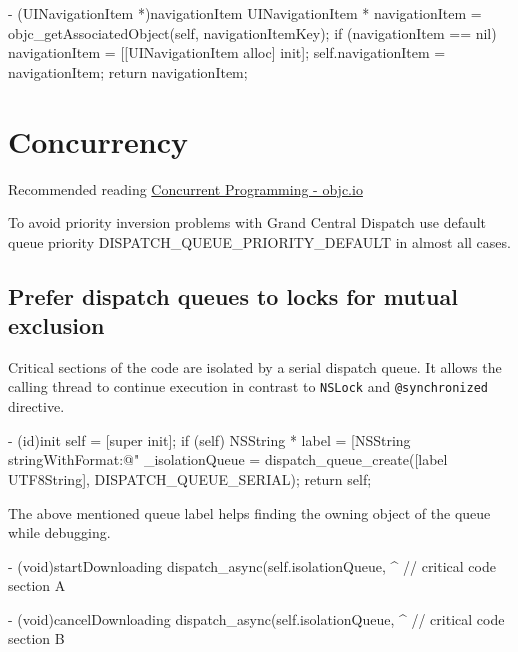 \documentclass[10pt]{extarticle}
\newenvironment{codelisting}
{\footnotesize\mdframed[middlelinewidth=0.5pt, middlelinecolor=BaliHaiColor, skipabove=15pt]\verbatim}
{\endverbatim\endmdframed\vspace{12pt}\normalsize}
\newenvironment{importantlisting}
{\mdframed[middlelinewidth=0.5pt, middlelinecolor=MatisseColor, skipabove=15pt]{\textbf{Important:}}}
{\endmdframed\vspace{12pt}}
\newcommand{\inlinecode}[1]{{\textcolor{TundoraColor}{\texttt{#1}}}}
\begin{document}
\begin{codelisting}
- (UINavigationItem *)navigationItem
{
    UINavigationItem * navigationItem = objc_getAssociatedObject(self, navigationItemKey);
    if (navigationItem == nil) {
        navigationItem = [[UINavigationItem alloc] init];
        self.navigationItem = navigationItem;
    }
    return navigationItem;
}
\end{codelisting}


\section{Concurrency}

Recommended reading  \href{http://www.objc.io/issue-2/}{Concurrent Programming - objc.io}

\begin{importantlisting}
To avoid priority inversion problems with Grand Central Dispatch use default queue priority DISPATCH\_QUEUE\_PRIORITY\_DEFAULT in almost all cases.
\end{importantlisting}


\subsection{Prefer dispatch queues to locks for mutual exclusion}

Critical sections of the code are isolated by a serial dispatch queue. It allows the calling thread to continue execution in contrast to \inlinecode{NSLock} and \inlinecode{@synchronized} directive.

\begin{codelisting}
- (id)init
{
    self = [super init];
    if (self) {
        NSString * label = [NSString stringWithFormat:@"%
        _isolationQueue = dispatch_queue_create([label UTF8String], DISPATCH_QUEUE_SERIAL);
    }
    return self;
}
\end{codelisting}

The above mentioned queue label helps finding the owning object of the queue while debugging.

\begin{codelisting}
- (void)startDownloading
{
    dispatch_async(self.isolationQueue, ^{
        // critical code section A
    }
}

- (void)cancelDownloading
{
    dispatch_async(self.isolationQueue, ^{
        // critical code section B
    }
}
\end{codelisting}
\end{document}
